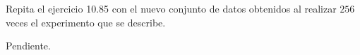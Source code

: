\begin{enunciado}
 Repita el ejercicio 10.85 con el nuevo conjunto de datos obtenidos
 al realizar $256$ veces el experimento que se describe.
\end{enunciado}

\begin{solucion}
 Pendiente.
\end{solucion}
